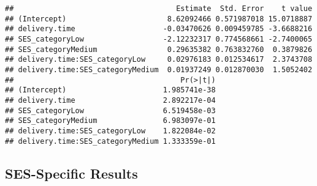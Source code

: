 \documentclass[
]{article}
\begin{document}
\begin{verbatim}
##                                     Estimate  Std. Error    t value
## (Intercept)                       8.62092466 0.571987018 15.0718887
## delivery.time                    -0.03470626 0.009459785 -3.6688216
## SES_categoryLow                  -2.12232317 0.774568661 -2.7400065
## SES_categoryMedium                0.29635382 0.763832760  0.3879826
## delivery.time:SES_categoryLow     0.02976183 0.012534617  2.3743708
## delivery.time:SES_categoryMedium  0.01937249 0.012870030  1.5052402
##                                      Pr(>|t|)
## (Intercept)                      1.985741e-38
## delivery.time                    2.892217e-04
## SES_categoryLow                  6.519458e-03
## SES_categoryMedium               6.983097e-01
## delivery.time:SES_categoryLow    1.822084e-02
## delivery.time:SES_categoryMedium 1.333359e-01
\end{verbatim}

\subsection{SES-Specific Results}\label{ses-specific-results}
\end{document}
